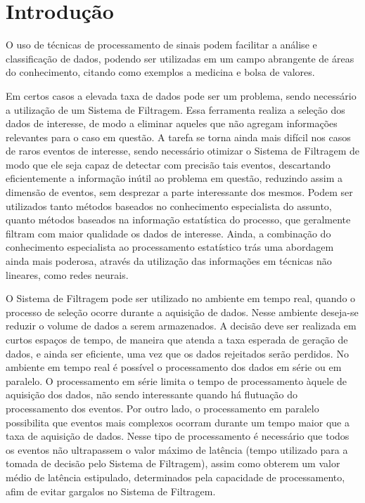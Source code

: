 \chapter{Introdução}
\glsresetall

O uso de técnicas de processamento de sinais podem facilitar a análise e
classificação de dados, podendo ser utilizadas em um campo abrangente de áreas
do conhecimento, citando como exemplos a medicina e bolsa de valores.

Em certos casos a elevada taxa de dados pode ser um problema, sendo necessário a
utilização de um Sistema de Filtragem. Essa ferramenta realiza a seleção dos dados 
de interesse, de modo a eliminar aqueles que não agregam informações relevantes 
para o caso em questão. A tarefa se torna ainda mais difícil nos casos de raros
eventos de interesse, sendo necessário otimizar o Sistema de Filtragem de modo que 
ele seja capaz de detectar com precisão tais eventos, descartando eficientemente a 
informação inútil ao problema em questão, reduzindo assim a dimensão 
de eventos, sem desprezar a parte interessante dos mesmos.
Podem ser utilizados tanto métodos baseados no conhecimento especialista do
assunto, quanto métodos baseados na informação estatística do processo, 
que geralmente filtram com maior qualidade os dados de interesse. Ainda, 
a combinação do conhecimento especialista ao processamento 
estatístico trás uma abordagem ainda mais poderosa, através da utilização das informações 
em técnicas não lineares, como redes neurais.

O Sistema de Filtragem pode ser utilizado no ambiente em tempo real,
quando o processo de seleção ocorre durante a aquisição de dados. Nesse ambiente
deseja-se reduzir o volume de dados a serem armazenados. A decisão deve ser realizada 
em curtos espaços de tempo, de maneira que atenda a taxa esperada de geração de
dados, e ainda ser eficiente, uma vez que os dados rejeitados serão perdidos. 
No ambiente em tempo real é possível o processamento dos dados em série
ou em paralelo. O processamento em série limita o tempo de processamento àquele
de aquisição dos dados, não sendo interessante quando há flutuação do
processamento dos eventos. Por outro lado, o processamento em
paralelo possibilita que eventos mais complexos ocorram durante um tempo maior
que a taxa de aquisição de dados. Nesse tipo de processamento é necessário que
todos os eventos não ultrapassem o valor máximo de latência (tempo utilizado
para a tomada de decisão pelo Sistema de Filtragem), assim como obterem um valor 
médio de latência estipulado, determinados pela capacidade de processamento,
afim de evitar gargalos no Sistema de Filtragem.

